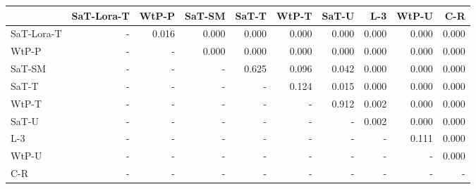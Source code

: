 \begin{tabular}{lrrrrrrrrr}
\toprule
 & SaT-Lora-T & WtP-P & SaT-SM & SaT-T & WtP-T & SaT-U & L-3 & WtP-U & C-R \\
\midrule
SaT-Lora-T & - & 0.016 & 0.000 & 0.000 & 0.000 & 0.000 & 0.000 & 0.000 & 0.000 \\
WtP-P & - & - & 0.000 & 0.000 & 0.000 & 0.000 & 0.000 & 0.000 & 0.000 \\
SaT-SM & - & - & - & 0.625 & 0.096 & 0.042 & 0.000 & 0.000 & 0.000 \\
SaT-T & - & - & - & - & 0.124 & 0.015 & 0.000 & 0.000 & 0.000 \\
WtP-T & - & - & - & - & - & 0.912 & 0.002 & 0.000 & 0.000 \\
SaT-U & - & - & - & - & - & - & 0.002 & 0.000 & 0.000 \\
L-3 & - & - & - & - & - & - & - & 0.111 & 0.000 \\
WtP-U & - & - & - & - & - & - & - & - & 0.000 \\
C-R & - & - & - & - & - & - & - & - & - \\
\bottomrule
\end{tabular}

